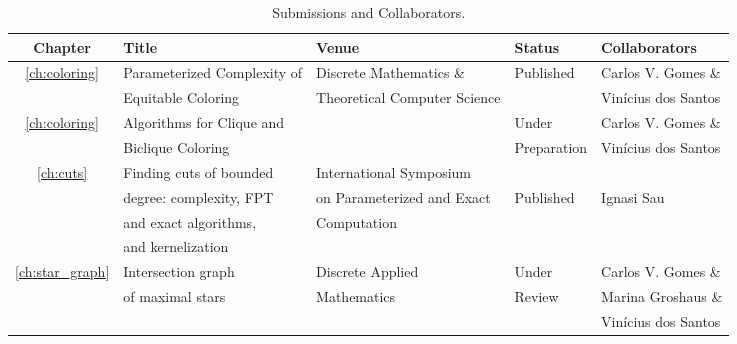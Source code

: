 \begin{table}[!htb]
\hspace{-3cm}
    \begin{tabular}{c|llll}
         Chapter                                & Title                       & Venue                         & Status    & Collaborators\\
         \hline
         \multirow{2}{1cm}{\ref{ch:coloring}}   & Parameterized Complexity of & Discrete Mathematics \&       & Published  & Carlos V. Gomes \& \\
                                                & Equitable Coloring          & Theoretical Computer Science  &             & Vinícius dos Santos \\
        \hline
        \multirow{2}{1cm}{\ref{ch:coloring}}    & Algorithms for Clique and   &                               & Under       & Carlos V. Gomes \& \\
                                                & Biclique Coloring           &                               & Preparation & Vinícius dos Santos \\
         \hline
         \multirow{4}{1cm}{\ref{ch:cuts}}       & Finding cuts of bounded     & International Symposium       &      & \\
                                                & degree: complexity, FPT     & on Parameterized and Exact    & Published    & Ignasi Sau\\
                                                & and exact algorithms,       & Computation                   &           & \\
                                                & and kernelization           &                               &           &\\
         \hline
         \multirow{3}{1cm}{\ref{ch:star_graph}} & Intersection graph          & Discrete Applied              & Under     & Carlos V. Gomes \& \\
                                                & of maximal stars            & Mathematics                   & Review    & Marina Groshaus \& \\
                                                &                             &                               &           & Vinícius dos Santos\\
    \end{tabular}\smallskip
    \caption{Submissions and Collaborators.}
    \label{tab:submissions}
\end{table}



